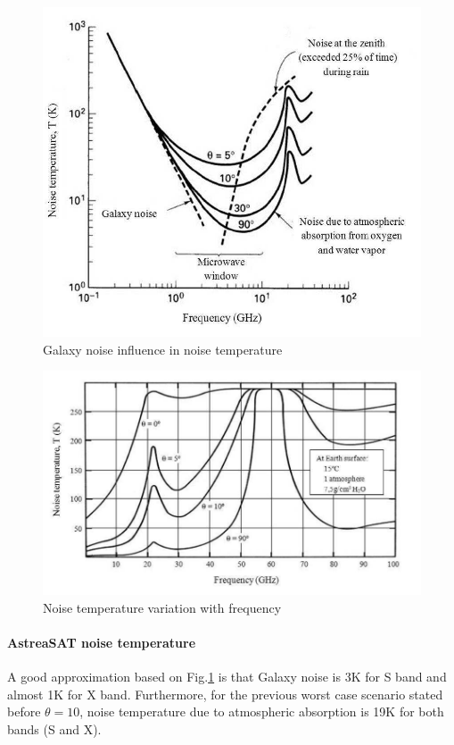 \begin{figure}[H]
	\includegraphics[scale=0.5]{./sections/SatelliteDept/sections/images/NoiseTemperature}
	\centering
	\caption[Galaxy noise influence in noise temperature]{Galaxy noise influence in noise temperature \cite{Jorge2012}}
	\label{NoiseTemperature}
\end{figure}
\begin{figure}[h]
	\includegraphics[scale=0.55]{./sections/SatelliteDept/sections/images/NoiseTemperature2}
	\centering
	\caption[Noise temperature variation with frequency]{Noise temperature variation with frequency \cite{Jorge2012}}
	\label{NoiseTemperature2}
\end{figure}

\paragraph{AstreaSAT noise temperature} A good approximation based on Fig.\ref{NoiseTemperature} is that Galaxy noise is 3K for S band and almost 1K for X band. Furthermore, for the previous worst case scenario stated before $\theta=10$, noise temperature due to atmospheric absorption is 19K for both bands (S and X).

